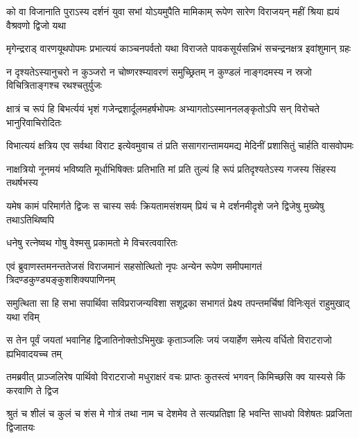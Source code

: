 


\fourlineindentedshloka
{को वा विजानाति पुराऽस्य दर्शनं}
{युवा सभां योऽयमुपैति मामिकाम्}
{रूपेण सारेण विराजयन् महीं}
{श्रिया ह्ययं वैश्रवणो द्विजो यथा}


\fourlineindentedshloka
{मृगेन्द्रराड् वारणयूथपोपमः}
{प्रभात्ययं काञ्चनपर्वतो यथा}
{विराजते पावकसूर्यसन्निभं}
{सचन्द्रनक्षत्र इवांशुमान् ग्रहः}


\fourlineindentedshloka
{न दृश्यतेऽस्यानुचरो न कुञ्जरो}
{न चोष्णरश्म्यावरणं समुच्छ्रितम्}
{न कुण्डलं नाङ्गदमस्य न स्रजो}
{विचित्रिताङ्गश्च रथश्चतुर्युजः}


\fourlineindentedshloka
{क्षात्रं च रूपं हि बिभर्त्ययं भृशं}
{गजेन्द्रशार्दूलमहर्षभोपमः}
{अभ्यागतोऽस्माननलङ्कृतोऽपि सन्}
{विरोचते भानुरिवाचिरोदितः}


\fourlineindentedshloka
{विभात्ययं क्षत्रिय एव सर्वथा}
{विराट इत्येवमुवाच तं प्रति}
{ससागरान्तामयमद्य मेदिनीं}
{प्रशासितुं चार्हति वासवोपमः}


\fourlineindentedshloka
{नाक्षत्रियो नूनमयं भविष्यति}
{मूर्धाभिषिक्तः प्रतिभाति मां प्रति}
{तुल्यं हि रूपं प्रतिदृश्यतेऽस्य}
{गजस्य सिंहस्य तथर्षभस्य}


\fourlineindentedshloka
{यमेष कामं परिमार्गते द्विजः}
{स चास्य सर्वः क्रियतामसंशयम्}
{प्रियं च मे दर्शनमीदृशे जने}
{द्विजेषु मुख्येषु तथाऽतिथिष्वपि}



\onelineindentedshloka
{धनेषु रत्नेष्वथ गोषु वेश्मसु}
{प्रकामतो मे विचरत्ववारितः}



\fourlineindentedshloka
{एवं ब्रुवाणस्तमनन्ततेजसं}
{विराजमानं सहसोत्थितो नृपः}
{अन्येन रूपेण समीपमागतं}
{त्रिदण्डकुण्ड्यङ्कुशशिक्यपाणिनम्}


\fourlineindentedshloka
{समुत्थिता सा हि सभा सपार्थिवा}
{सविप्रराजन्यविशा सशूद्रका}
{सभागतं प्रेक्ष्य तपन्तमर्चिषां}
{विनिःसृतं राहुमुखाद् यथा रविम्}


\fourlineindentedshloka
{स तेन पूर्वं जयतां भवानिह}
{द्विजातिनोक्तोऽभिमुखः कृताञ्जलिः}
{जयं जयार्हेण समेत्य वर्धितो}
{विराटराजो ह्यभिवादयच्च तम्}


\fourlineindentedshloka
{तमब्रवीत् प्राञ्जलिरेष पार्थिवो}
{विराटराजो मधुराक्षरं वचः}
{प्राप्तः कुतस्त्वं भगवन् किमिच्छसि}
{क्व यास्यसे किं करवाणि ते द्विज}


\fourlineindentedshloka
{श्रुतं च शीलं च कुलं च शंस मे}
{गोत्रं तथा नाम च देशमेव ते}
{सत्यप्रतिज्ञा हि भवन्ति साधवो}
{विशेषतः प्रव्रजिता द्विजातयः}


